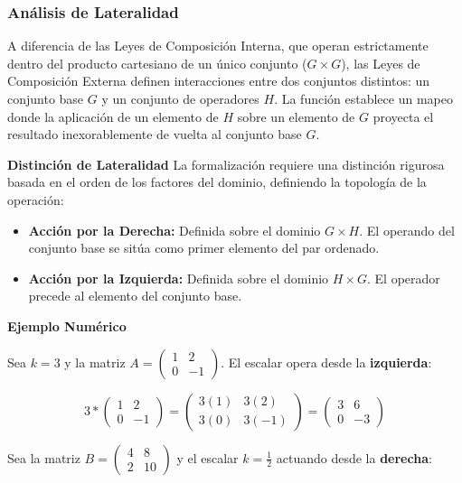 \documentclass{article}
\begin{document}
\subsubsection{Análisis de Lateralidad}

\bigskip

A diferencia de las Leyes de Composición Interna, que operan estrictamente dentro del producto cartesiano de un único conjunto ($G \times G$), las Leyes de Composición Externa definen interacciones entre dos conjuntos distintos: un conjunto base $G$ y un conjunto de operadores $H$. La función establece un mapeo donde la aplicación de un elemento de $H$ sobre un elemento de $G$ proyecta el resultado inexorablemente de vuelta al conjunto base $G$.
\bigskip

\noindent \textbf{Distinción de Lateralidad}
La formalización requiere una distinción rigurosa basada en el orden de los factores del dominio, definiendo la topología de la operación:
\begin{itemize}
    \item \textbf{Acción por la Derecha:} Definida sobre el dominio $G \times H$. El operando del conjunto base se sitúa como primer elemento del par ordenado.
    \item \textbf{Acción por la Izquierda:} Definida sobre el dominio $H \times G$. El operador precede al elemento del conjunto base.
\end{itemize}

\noindent \textbf{Ejemplo Numérico}


Sea $k = 3$ y la matriz $A = \begin{pmatrix} 1 & 2 \\ 0 & -1 \end{pmatrix}$. El escalar opera desde la \textbf{izquierda}:
\bigskip

\[ 3 \ast \begin{pmatrix} 1 & 2 \\ 0 & -1 \end{pmatrix} = \begin{pmatrix} 3(1) & 3(2) \\ 3(0) & 3(-1) \end{pmatrix} = \begin{pmatrix} 3 & 6 \\ 0 & -3 \end{pmatrix} \]

\bigskip

Sea la matriz $B = \begin{pmatrix} 4 & 8 \\ 2 & 10 \end{pmatrix}$ y el escalar $k = \frac{1}{2}$ actuando desde la \textbf{derecha}:
\bigskip
\end{document}
